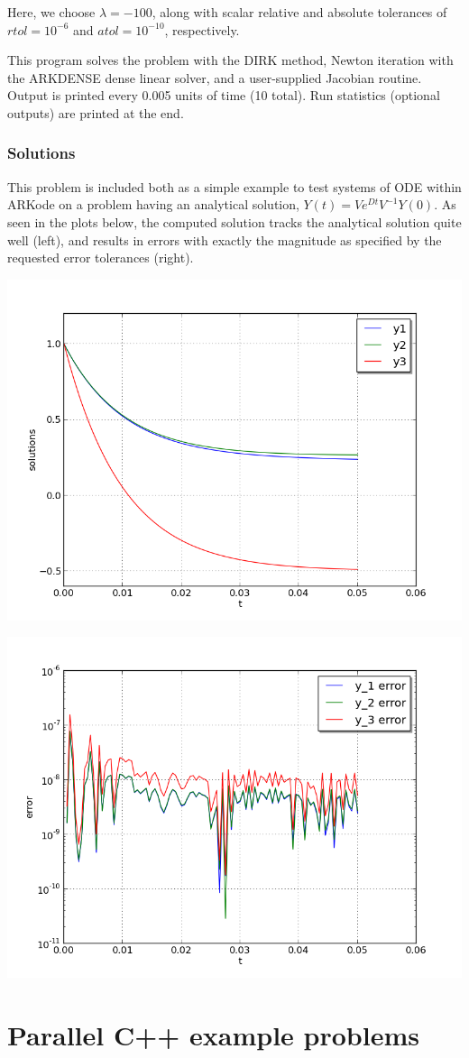 \documentclass[letterpaper,10pt,english]{sphinxmanual}
\begin{document}
Here, we choose \(\lambda = -100\), along with scalar relative and
absolute tolerances of \(rtol=10^{-6}\) and \(atol=10^{-10}\),
respectively.

This program solves the problem with the DIRK method,
Newton iteration with the ARKDENSE dense linear solver, and a
user-supplied Jacobian routine.
Output is printed every 0.005 units of time (10 total).
Run statistics (optional outputs) are printed at the end.


\subsection{Solutions}
\label{cpp_serial:solutions}
This problem is included both as a simple example to test systems of
ODE within ARKode on a problem having an analytical
solution, \(Y(t) = V e^{Dt} V^{-1} Y(0)\).  As
seen in the plots below, the computed solution tracks the analytical
solution quite well (left), and results in errors with exactly the
magnitude as specified by the requested error tolerances (right).

\includegraphics[width=0.450\linewidth]{plot-ark_analytic_sys.png}

\includegraphics[width=0.450\linewidth]{plot-ark_analytic_sys_error.png}


\chapter{Parallel C++ example problems}
\label{cpp_parallel:parallel-cpp}\label{cpp_parallel::doc}\label{cpp_parallel:parallel-c-example-problems}
\end{document}
